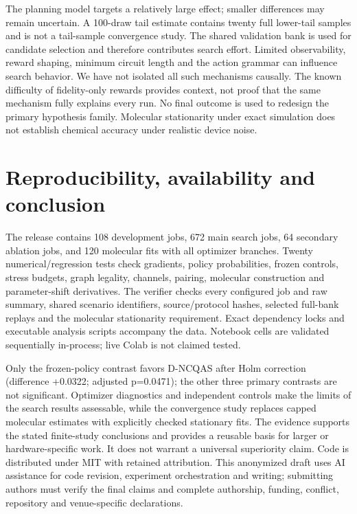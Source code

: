 \documentclass[11pt]{article}
\begin{document}
The planning model targets a relatively large effect; smaller differences may remain uncertain. A 100-draw tail estimate contains twenty full lower-tail samples and is not a tail-sample convergence study. The shared validation bank is used for candidate selection and therefore contributes search effort. Limited observability, reward shaping, minimum circuit length and the action grammar can influence search behavior. We have not isolated all such mechanisms causally. The known difficulty of fidelity-only rewards \cite{trap} provides context, not proof that the same mechanism fully explains every run. No final outcome is used to redesign the primary hypothesis family. Molecular stationarity under exact simulation does not establish chemical accuracy under realistic device noise.

\section{Reproducibility, availability and conclusion}
The release contains 108 development jobs, 672 main search jobs, 64 secondary ablation jobs, and 120 molecular fits with all optimizer branches. Twenty numerical/regression tests check gradients, policy probabilities, frozen controls, stress budgets, graph legality, channels, pairing, molecular construction and parameter-shift derivatives. The verifier checks every configured job and raw summary, shared scenario identifiers, source/protocol hashes, selected full-bank replays and the molecular stationarity requirement. Exact dependency locks and executable analysis scripts accompany the data. Notebook cells are validated sequentially in-process; live Colab is not claimed tested.

Only the frozen-policy contrast favors D-NCQAS after Holm correction (difference +0.0322; adjusted p=0.0471); the other three primary contrasts are not significant. Optimizer diagnostics and independent controls make the limits of the search results assessable, while the convergence study replaces capped molecular estimates with explicitly checked stationary fits. The evidence supports the stated finite-study conclusions and provides a reusable basis for larger or hardware-specific work. It does not warrant a universal superiority claim. Code is distributed under MIT with retained attribution. This anonymized draft uses AI assistance for code revision, experiment orchestration and writing; submitting authors must verify the final claims and complete authorship, funding, conflict, repository and venue-specific declarations.
\end{document}
